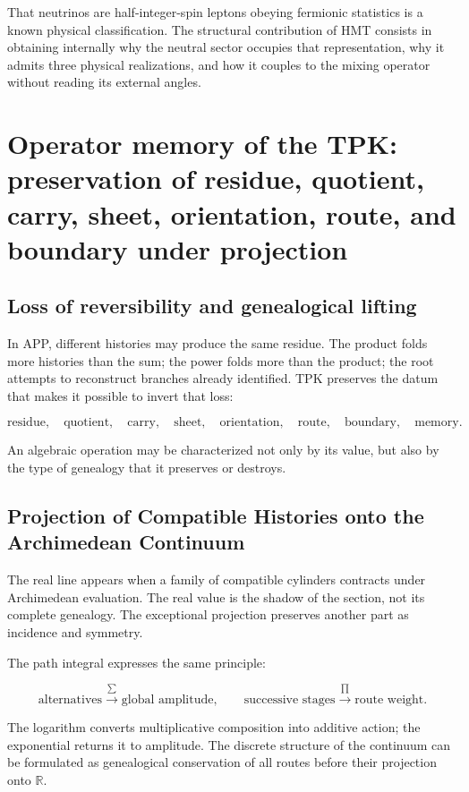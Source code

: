 That neutrinos are half-integer-spin leptons obeying fermionic statistics is a known physical classification. The structural contribution of HMT consists in obtaining internally why the neutral sector occupies that representation, why it admits three physical realizations, and how it couples to the mixing operator without reading its external angles.


\section{Operator memory of the TPK: preservation of residue, quotient, carry, sheet, orientation, route, and boundary under projection}

\subsection{Loss of reversibility and genealogical lifting}

In APP, different histories may produce the same residue. The product folds more histories than the sum; the power folds more than the product; the root attempts to reconstruct branches already identified. TPK preserves the datum that makes it possible to invert that loss:

\[
\text{residue},\quad
\text{quotient},\quad
\text{carry},\quad
\text{sheet},\quad
\text{orientation},\quad
\text{route},\quad
\text{boundary},\quad
\text{memory}.
\]

An algebraic operation may be characterized not only by its value, but also by the type of genealogy that it preserves or destroys.

\subsection{Projection of Compatible Histories onto the Archimedean Continuum}

The real line appears when a family of compatible cylinders contracts under Archimedean evaluation. The real value is the shadow of the section, not its complete genealogy. The exceptional projection preserves another part as incidence and symmetry.

The path integral expresses the same principle:

\[
\text{alternatives}\xrightarrow{\sum}\text{global amplitude},
\qquad
\text{successive stages}\xrightarrow{\prod}\text{route weight}.
\]

The logarithm converts multiplicative composition into additive action; the exponential returns it to amplitude. The discrete structure of the continuum can be formulated as genealogical conservation of all routes before their projection onto \(\mathbb R\).

